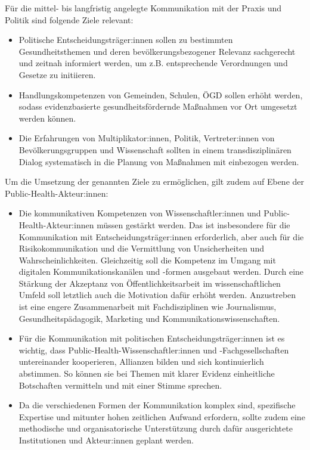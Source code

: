\documentclass{article}
\begin{document}
Für die mittel- bis langfristig angelegte Kommunikation mit der Praxis und Politik sind folgende Ziele relevant:

\begin{itemize}
\item Politische Entscheidungsträger:innen sollen zu bestimmten Gesundheitsthemen und deren bevölkerungsbezogener Relevanz sachgerecht und zeitnah informiert werden, um z.B. entsprechende Verordnungen und Gesetze zu initiieren.


\item Handlungskompetenzen von Gemeinden, Schulen, ÖGD sollen erhöht werden, sodass evidenzbasierte gesundheitsfördernde Maßnahmen vor Ort umgesetzt werden können.


\item Die Erfahrungen von Multiplikator:innen, Politik, Vertreter:innen von Bevölkerungsgruppen und Wissenschaft sollten in einem transdisziplinären Dialog systematisch in die Planung von Maßnahmen mit einbezogen werden.


\end{itemize}

Um die Umsetzung der genannten Ziele zu ermöglichen, gilt zudem auf Ebene der Public-Health-Akteur:innen:

\begin{itemize}
\item Die kommunikativen Kompetenzen von Wissenschaftler:innen und Public-Health-Akteur:innen müssen gestärkt werden. Das ist insbesondere für die Kommunikation mit Entscheidungsträger:innen erforderlich, aber auch für die Risikokommunikation und die Vermittlung von Unsicherheiten und Wahrscheinlichkeiten. Gleichzeitig soll die Kompetenz im Umgang mit digitalen Kommunikationskanälen und -formen ausgebaut werden. Durch eine Stärkung der Akzeptanz von Öffentlichkeitsarbeit im wissenschaftlichen Umfeld soll letztlich auch die Motivation dafür erhöht werden. Anzustreben ist eine engere Zusammenarbeit mit Fachdisziplinen wie Journalismus, Gesundheitspädagogik, Marketing und Kommunikationswissenschaften.


\item Für die Kommunikation mit politischen Entscheidungsträger:innen ist es wichtig, dass Public-Health-Wissenschaftler:innen und -Fachgesellschaften untereinander kooperieren, Allianzen bilden und sich kontinuierlich abstimmen. So können sie bei Themen mit klarer Evidenz einheitliche Botschaften vermitteln und mit einer Stimme sprechen.


\item Da die verschiedenen Formen der Kommunikation komplex sind, spezifische Expertise und mitunter hohen zeitlichen Aufwand erfordern, sollte zudem eine methodische und organisatorische Unterstützung durch dafür ausgerichtete Institutionen und Akteur:innen geplant werden.


\end{itemize}
\end{document}
